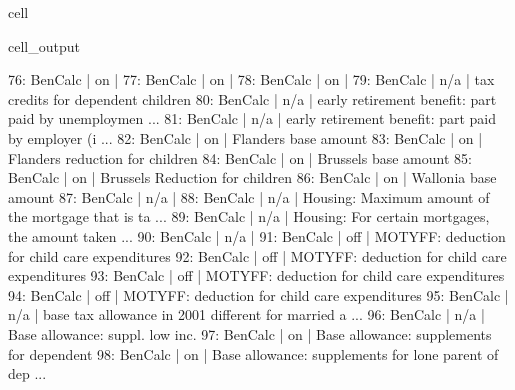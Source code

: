 \documentclass[letterpaper,10pt,english]{sphinxmanual}
\begin{document}
\begin{sphinxuseclass}{cell}
\begin{sphinxuseclass}{cell_output}
\begin{sphinxVerbatim}[commandchars=\\\{\}]
76: BenCalc      | on                                                       |     
77: BenCalc      | on                                                       |     
78: BenCalc      | on                                                       |     
79: BenCalc      | n/a                                                      |    tax credits for dependent children 
80: BenCalc      | n/a                                                      |    early retirement benefit: part paid by unemploymen ... 
81: BenCalc      | n/a                                                      |    early retirement benefit: part paid by employer (i ... 
82: BenCalc      | on                                                       |    Flanders \PYGZhy{} base amount 
83: BenCalc      | on                                                       |    Flanders \PYGZhy{} reduction for children 
84: BenCalc      | on                                                       |    Brussels \PYGZhy{} base amount 
85: BenCalc      | on                                                       |    Brussels \PYGZhy{} Reduction for children 
86: BenCalc      | on                                                       |    Wallonia \PYGZhy{} base amount 
87: BenCalc      | n/a                                                      |     
88: BenCalc      | n/a                                                      |    Housing: Maximum amount of the mortgage that is ta ... 
89: BenCalc      | n/a                                                      |    \PYGZdq{}Housing: For certain mortgages, the amount taken  ... 
90: BenCalc      | n/a                                                      |     
91: BenCalc      | off                                                      |    MOTYFF: deduction for child care expenditures 
92: BenCalc      | off                                                      |    MOTYFF: deduction for child care expenditures 
93: BenCalc      | off                                                      |    MOTYFF: deduction for child care expenditures 
94: BenCalc      | off                                                      |    MOTYFF: deduction for child care expenditures 
95: BenCalc      | n/a                                                      |    base tax allowance in 2001 different for married a ... 
96: BenCalc      | n/a                                                      |    Base allowance: suppl. low inc. 
97: BenCalc      | on                                                       |    Base allowance: supplements for dependent 
98: BenCalc      | on                                                       |    Base allowance: supplements for lone parent of dep ... 

\end{sphinxVerbatim}
\end{sphinxuseclass}
\end{sphinxuseclass}
\end{document}
